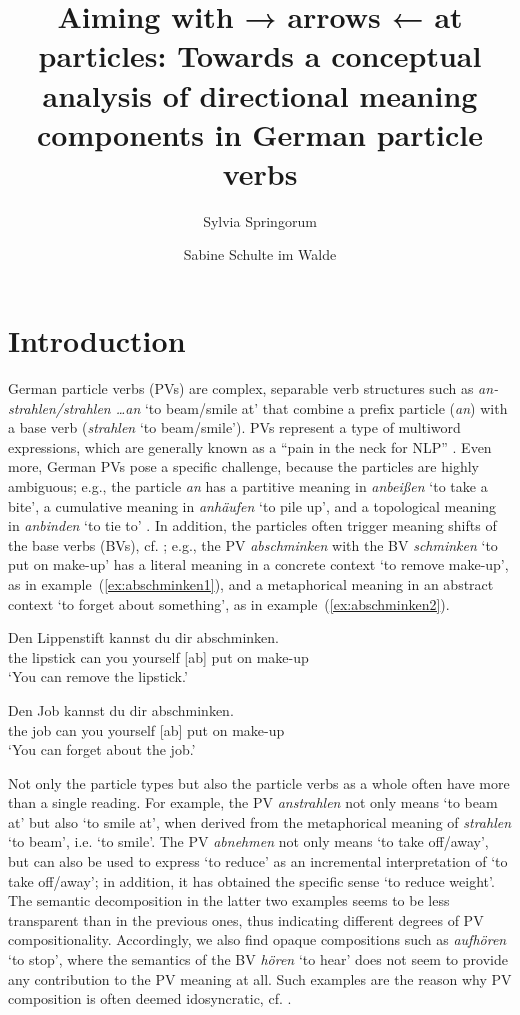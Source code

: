 \documentclass[output=paper]{langsci/langscibook}
\title{Aiming with → arrows ← at particles: Towards a conceptual analysis of directional meaning components in German particle verbs}
\author{Sylvia Springorum\affiliation{Institut für Maschinelle Sprachverarbeitung, Universität Stuttgart}\and  Sabine Schulte im Walde\affiliation{Institut für Maschinelle Sprachverarbeitung, Universität Stuttgart}}
\begin{document}
\maketitle


\clearpage
\section{Introduction}

German particle verbs (PVs) are complex, separable verb structures such as
\textit{an- strahlen/strahlen \ldots an} `to beam/smile at' that combine a prefix particle
(\textit{an}) with a base verb (\textit{strahlen} `to
beam/smile'). PVs
represent a type of multiword expressions, which are generally known
as a ``pain in the neck for NLP'' \citep{SagEtAl:02}. Even
more, German PVs pose a specific challenge, because the particles are
highly ambiguous; e.g., the particle \textit{an} has a partitive
meaning in \textit{anbeißen} `to take a bite', a cumulative meaning in
\textit{anhäufen} `to pile up', and a topological meaning in
\textit{anbinden} `to tie to' \citep{Springorum:11}. In addition, the
particles often trigger meaning shifts of the base verbs (BVs),
cf. \citet{SpringorumEtAl:13,FrassinelliEtAl:17,Koeper/SchulteImWalde:18,SchulteImWaldeEtAl:18};
e.g., the PV \textit{abschminken} with the BV \textit{schminken} `to
put on make-up' has a literal meaning in a concrete context `to
remove make-up', as in example~(\ref{ex:abschminken1}), and a
metaphorical meaning in an abstract context `to forget about
something', as in example~(\ref{ex:abschminken2}).

\ea\label{ex:abschminken1}
\gll Den Lippenstift kannst du dir abschminken.\\
the lipstick can you yourself {[ab] put on make-up}\\
\glt `You can remove the lipstick.'

\ex\label{ex:abschminken2}
\gll Den Job kannst du dir abschminken.\\
the job can you yourself {[ab] put on make-up}\\
\glt `You can forget about the job.'
\z


Not only the particle types but also the particle verbs as a whole
often have more than a single reading. For example, the PV
\textit{anstrahlen} not only means `to beam at' but also `to smile
at', when derived from the metaphorical meaning of \textit{strahlen}
`to beam', i.e. `to smile'. The PV \textit{abnehmen} not only means
`to take off/away', but can also be used to express `to reduce' as an
incremental interpretation of `to take off/away'; in addition, it has
obtained the specific sense `to reduce weight'. The semantic
decomposition in the latter two examples seems to be less transparent
than in the previous ones, thus indicating different degrees of PV
compositionality. Accordingly, we also find opaque compositions such
as \textit{aufhören} `to stop', where the semantics of the BV
\textit{hören} `to hear' does not seem to provide any contribution
to the PV meaning at all. Such examples are the reason why PV
composition is often deemed idosyncratic, cf. \cite{Kratzer:03}.
\end{document}
